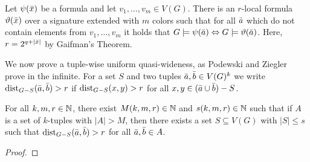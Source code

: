\begin{theorem}
Let $\psi(\bar{x})$ be a formula and let $v_1,\ldots, v_m\in V(G)$. 
There is an $r$-local formula $\vartheta(\bar{x})$ 
over a signature extended 
with $m$ colors such that for all $\bar{a}$ which do not
contain elements from $v_1,\ldots, v_m$ it holds that
$G\models\psi(\bar{a})\Leftrightarrow G\models\vartheta(\bar{a})$. 
Here, $r=2^{q+|\bar{x}|}$ by Gaifman's Theorem.
\end{theorem}

We now prove a tuple-wise uniform quasi-wideness, as Podewski and Ziegler 
prove in the infinite. For a set $S$ and two tuples $\bar{a},\bar{b}\in V(G)^k$
we write $\mathrm{dist}_{G-S}(\bar{a},\bar{b})>r$ if $\mathrm{dist}_{G-S}(x,y)>r$ for all $x,y\in 
(\bar{a}\cup\bar{b})- S$. 

\begin{lemma}
For all $k,m,r\in \mathbb{N}$, there exist $M(k,m,r)\in \mathbb{N}$ and 
$s(k,m,r)\in \mathbb{N}$ such that if $A$ is a set of $k$-tuples
with $|A|>M$, then there exists a set $S\subseteq V(G)$
with $|S|\leq s$ such that $\mathrm{dist}_{G-S}(\bar{a},\bar{b})>r$
for all $\bar{a},\bar{b}\in A$. 
\end{lemma}
\begin{proof}

\end{proof}
